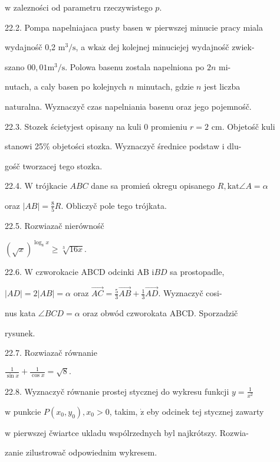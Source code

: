 \documentclass[a4paper,12pt]{article}
\begin{document}
$\mathrm{w}$ zalezności od parametru rzeczywistego $p.$

22.2. Pompa napelniajaca pusty basen $\mathrm{w}$ pierwszej minucie pracy miala

wydajnośč 0,2 $\mathrm{m}^{3}/\mathrm{s}$, a $\mathrm{w}\mathrm{k}\mathrm{a}\dot{\mathrm{z}}$ dej kolejnej minuciejej wydajnośč zwiek-

szano $0 0,01 \mathrm{m}^{3}/\mathrm{s}$. Polowa basenu zostala napelniona po $2n$ mi-

nutach, a caly basen po kolejnych $n$ minutach, gdzie $n$ jest liczba

naturalna. Wyznaczyč czas napelniania basenu oraz jego pojemnośč.

22.3. Stozek ścietyjest opisany na kuli $0$ promieniu $r=2$ cm. Objetośč kuli

stanowi 25\% objetości stozka. Wyznaczyč średnice podstaw $\mathrm{i}$ dlu-

gośč tworzacej tego stozka.

22.4. $\mathrm{W}$ trójkacie $ABC$ dane sa promień okregu opisanego $R, \mathrm{k}\mathrm{a}\mathrm{t}\angle A=\alpha$

oraz $|AB|=\displaystyle \frac{8}{5}R$. Obliczyč pole tego trójkata.

22.5. Rozwiazač nierównośč

$(\sqrt{x})^{\log_{8}x}\geq\sqrt[3]{16x}.$

22.6. $\mathrm{W}$ czworokacie ABCD odcinki AB $\mathrm{i} BD$ sa prostopadle,

$|AD| = 2|AB| = \alpha$ oraz $\vec{AC}= \displaystyle \frac{5}{3} \vec{AB} +\displaystyle \frac{1}{3} \vec{AD}$. Wyznaczyč cosi-

nus kata $\angle BCD = \alpha$ oraz obwód czworokata ABCD. Sporzadzič

rysunek.

22.7. Rozwiazač równanie

$\displaystyle \frac{1}{\sin x}+\frac{1}{\cos x}=\sqrt{8}.$

22.8. Wyznaczyč równanie prostej stycznej do wykresu funkcji $y = \displaystyle \frac{1}{x^{2}}$

$\mathrm{w}$ punkcie $P(x_{0},y_{0}), x_{0}>0$, takim, $\dot{\mathrm{z}}$ eby odcinek tej stycznej zawarty

$\mathrm{w}$ pierwszej čwiartce ukladu wspólrzednych byl najkrótszy. Rozwia-

zanie zilustrowač odpowiednim wykresem.
\end{document}
